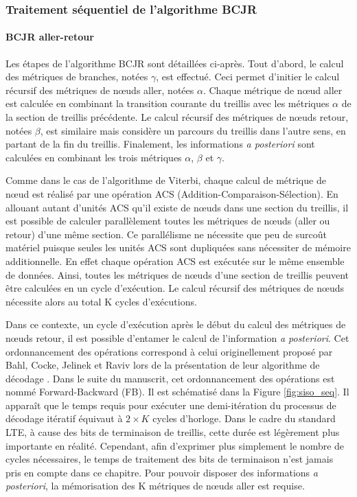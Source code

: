 \subsubsection{Traitement séquentiel de l'algorithme BCJR}
\paragraph*{BCJR aller-retour}
Les étapes de l'algorithme BCJR sont détaillées ci-après. Tout d'abord, le calcul des métriques de branches, notées 
$\gamma$, est effectué. Ceci permet d’initier le calcul récursif des métriques de nœuds aller, notées $\alpha$. Chaque 
métrique de nœud aller est calculée en combinant la transition courante du treillis avec les métriques $\alpha$ de la 
section de treillis précédente. Le calcul récursif des métriques de nœuds retour, notées $\beta$, est similaire mais
considère un parcours du treillis %
dans l'autre sens, en partant de la fin du treillis. Finalement, les 
informations \textit{a posteriori} sont calculées en combinant les trois métriques $\alpha$, $\beta$ et $\gamma$. 

Comme dans le cas de l'algorithme de Viterbi, chaque calcul de métrique de nœud est réalisé par une opération ACS 
(Addition-Comparaison-Sélection). En allouant autant d'unités ACS qu'il existe de nœuds dans une section du treillis, 
il est possible de calculer parallèlement toutes les métriques de nœuds (aller ou retour) d'une même section. Ce
parallélisme ne nécessite que peu de surcoût matériel puisque seules les unités ACS sont dupliquées sans nécessiter
de mémoire additionnelle. En effet chaque opération ACS est exécutée sur le même ensemble de données. Ainsi, toutes les 
métriques de nœuds d'une section de treillis peuvent être calculées en un cycle d'exécution. Le calcul récursif des métriques de 
nœuds nécessite alors au total K cycles d'exécutions.

Dans ce contexte, un cycle d'exécution après le début du calcul des métriques de nœuds retour, il est possible d'entamer le calcul de l'information 
\textit{a posteriori}. Cet ordonnancement des opérations correspond à celui originellement proposé par Bahl, Cocke, 
Jelinek et Raviv lors de la présentation de leur algorithme de décodage \cite{bcjr}. Dans le suite du manuscrit, cet
ordonnancement des opérations est nommé Forward-Backward (FB). Il est schématisé dans la Figure \ref{fig:siso_seq}.
Il apparaît que le temps requis pour exécuter une demi-itération du processus de décodage itératif équivaut à $2\times K$ cycles d'horloge. Dans le cadre du standard LTE, à cause des bits de terminaison de treillis, cette durée est légèrement
plus importante en réalité. Cependant, afin d'exprimer plus simplement le nombre de cycles nécessaires, le temps de 
traitement des bits de terminaison n'est jamais pris en compte dans ce chapitre.
Pour pouvoir disposer des informations 
\textit{a posteriori}, la mémorisation des K métriques de nœuds aller est requise. 

